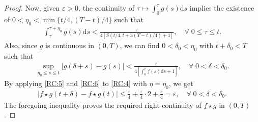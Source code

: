 \documentclass[10pt,a4paper]{amsart}
\renewcommand{\d}{{\mathrm d}}
\newcommand{\vep}{{\varepsilon}}
\begin{document}
\begin{proof}
Now, given $\vep>0$, the continuity of $\tau\mapsto \int_0^\tau g(s)\d s$ implies the existence of $0<\eta_0<\min\{t/4,(T-t)/4\}$ such that 
\begin{align}\label{RC:5}
\int_\tau^{\tau+\eta_0}g(s)\d s<\frac{\vep}{4[S(t/4,t+3(T-t)/4)+1]},\quad \forall\;0\leq \tau\leq t.
\end{align}
Also, since $g$ is continuous in $(0,T)$, we can find $0<\delta_0<\eta_0$ with $t+\delta_0<T$ such that 
\begin{align}\label{RC:6}
\sup_{\eta_0\leq s\leq t}|g(\delta+s)-g(s)|<\frac{\vep}{4[\int_0^t f(s)\d s+1]},\quad \forall\;0<\delta<\delta_0.
\end{align}
By applying \eqref{RC:5} and \eqref{RC:6} to \eqref{RC:4} with $\eta=\eta_0$, we get 
\begin{align*}
|f\star g(t+\delta)-f\star g(t)|\leq \frac{\vep}{4}+\frac{\vep}{4}\cdot 2+\frac{\vep}{4}=\vep,\quad\forall\;0<\delta<\delta_0.
\end{align*}
The foregoing inequality proves the required right-continuity of $f\star g$ in $(0,T)$.


\end{proof}
\end{document}
